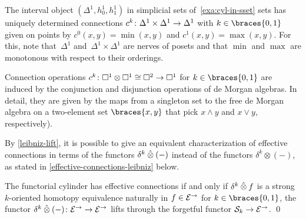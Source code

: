 \documentclass[reqno,10pt,a4paper,oneside,draft]{amsart}
\begin{document}
\begin{example}
The interval object $(\Delta^1, h_0^1, h_1^1)$ in simplicial sets of~\cref{exa:cyl-in-sset} sets has uniquely determined connections $c^k \colon \Delta^1 \times \Delta^1 \to \Delta^1$ with $k \in \braces{0, 1}$ given on points by $c^0(x, y) = \min(x, y)$ and $c^1(x, y) = \max(x, y)$.
For this, note that~$\Delta^1$ and~$\Delta^1 \times \Delta^1$ are nerves of posets and that $\min$ and $\max$ are monotonous with respect to their orderings.
\end{example}

\begin{example}
Connection operations $c^k \colon \Box^1 \otimes \Box^1 \cong \Box^2 \to \Box^1$ for $k \in \braces{0, 1}$ are induced by the conjunction and disjunction operations of de Morgan algebras.
In detail, they are given by the maps from a singleton set to the free de Morgan algebra on a two-element set $\braces{x, y}$ that pick $x \wedge y$ and $x \vee y$, respectively).
\end{example}

By \cref{leibniz-lift}, it is possible to give an equivalent characterization of effective connections in terms of the functors $\delta^k \mathbin{\hat{\otimes}} (-)$ instead of the functors $\delta^k \otimes (-)$, as stated in \cref{effective-connections-leibniz} below.

\begin{corollary} \label{effective-connections-leibniz}
The functorial cylinder has effective connections if and only if $\delta^k \mathbin{\hat{\otimes}} f$ is a strong $k$-oriented homotopy equivalence naturally in $f \in \mathcal{E}^\to$ for $k \in \braces{0, 1}$, \ie the functor $\delta^k \mathbin{\hat{\otimes}} (-) \colon \mathcal{E}^\to \to \mathcal{E}^\to$ lifts through the forgetful functor $\mathcal{S}_k \to \mathcal{E}^\to$.
\qed
\end{corollary}
\end{document}
